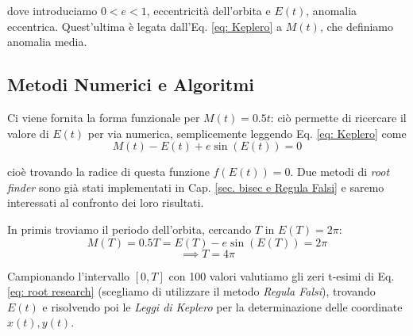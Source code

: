 \noindent dove introduciamo $0<e<1$, eccentricità dell'orbita e $E(t)$, anomalia eccentrica. Quest'ultima è legata dall'Eq. \ref{eq: Keplero} a $M(t)$, che definiamo anomalia media. 

\subsection{Metodi Numerici e Algoritmi}
Ci viene fornita la forma funzionale per $M(t) = 0.5t$: ciò permette di ricercare il valore di $E(t)$ per via numerica, semplicemente leggendo Eq. \ref{eq: Keplero} come
\begin{equation} \label{eq: root research}
M(t) - E(t) + e \sin(E(t)) = 0
\end{equation}

\noindent cioè trovando la radice di questa funzione $f(E(t))=0$. Due metodi di \textit{root finder} sono già stati implementati in Cap. \ref{sec. bisec e Regula Falsi} e saremo interessati al confronto dei loro risultati.

\bigskip
\noindent In primis troviamo il periodo dell'orbita, cercando $T$ in $E(T) = 2 \pi$:
\[
M(T) = 0.5T = E(T) - e  \sin(E(T)) = 2\pi
\]
\[
\implies T = 4 \pi
\]

\noindent Campionando l'intervallo $[0, T]$ con 100 valori valutiamo gli zeri t-esimi di Eq. \ref{eq: root research} (scegliamo di utilizzare il metodo \textit{Regula Falsi}), trovando $E(t)$ e risolvendo poi le \textit{Leggi di Keplero} per la determinazione delle coordinate $x(t), y(t)$.


